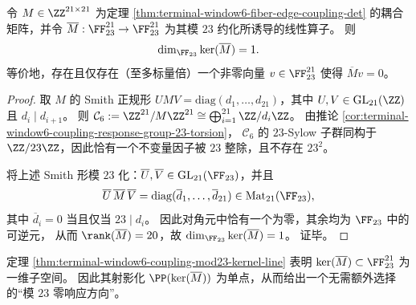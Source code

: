 \begin{theorem}\label{thm:terminal-window6-coupling-mod23-kernel-line}
令 \(M\in\ZZ^{21\times 21}\) 为定理 \ref{thm:terminal-window6-fiber-edge-coupling-det} 的耦合矩阵，并令
\(\overline M:\FF_{23}^{21}\to \FF_{23}^{21}\) 为其模 \(23\) 约化所诱导的线性算子。
则
\[
\dim_{\FF_{23}}\ker(\overline M)=1.
\]
等价地，存在且仅存在（至多标量倍）一个非零向量 \(v\in \FF_{23}^{21}\) 使得 \(\overline Mv=0\)。
\end{theorem}
\begin{proof}
取 \(M\) 的 Smith 正规形 \(UMV=\mathrm{diag}(d_1,\dots,d_{21})\)，其中 \(U,V\in\mathrm{GL}_{21}(\ZZ)\) 且 \(d_i\mid d_{i+1}\)。
则
\(
\mathcal C_6:=\ZZ^{21}/M\ZZ^{21}\cong \bigoplus_{i=1}^{21}\ZZ/d_i\ZZ
\)。
由推论 \ref{cor:terminal-window6-coupling-response-group-23-torsion}，
\(\mathcal C_6\) 的 \(23\)-Sylow 子群同构于 \(\ZZ/23\ZZ\)，因此恰有一个不变量因子被 \(23\) 整除，且不存在 \(23^2\)。
\par
将上述 Smith 形模 \(23\) 化：\(\overline U,\overline V\in\mathrm{GL}_{21}(\FF_{23})\)，并且
\[
\overline U\,\overline M\,\overline V=\mathrm{diag}(\overline d_1,\dots,\overline d_{21})\in \mathrm{Mat}_{21}(\FF_{23}),
\]
其中 \(\overline d_i=0\) 当且仅当 \(23\mid d_i\)。
因此对角元中恰有一个为零，其余均为 \(\FF_{23}\) 中的可逆元，
从而 \(\rank(\overline M)=20\)，故 \(\dim_{\FF_{23}}\ker(\overline M)=1\)。
证毕。
\end{proof}

\begin{remark}\label{rem:terminal-window6-mod23-response-line}
定理 \ref{thm:terminal-window6-coupling-mod23-kernel-line} 表明 \(\ker(\overline M)\subset \FF_{23}^{21}\) 为一维子空间。
因此其射影化 \(\PP(\ker(\overline M))\) 为单点，从而给出一个无需额外选择的“模 \(23\) 零响应方向”。
\end{remark}

